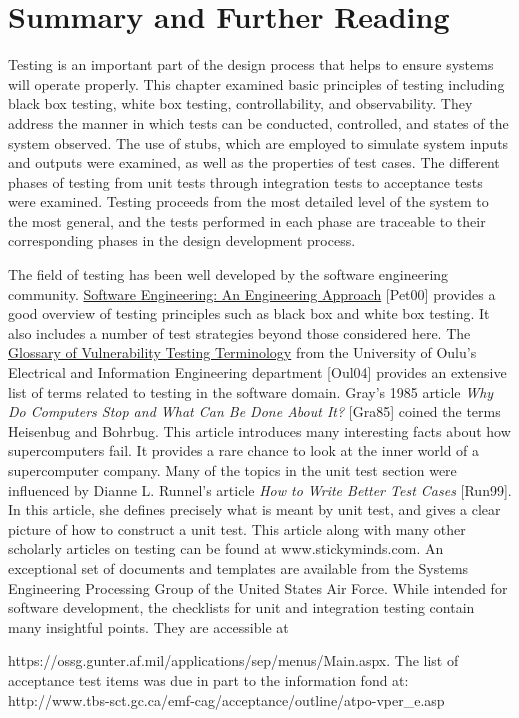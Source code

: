 \section{Summary and Further Reading}
\label{section:summary-and-further-reading}

Testing is an important part of the design process that helps to ensure
systems will operate properly. This chapter examined basic principles of
testing including black box testing, white box testing, controllability,
and observability. They address the manner in which tests can be
conducted, controlled, and states of the system observed. The use of
stubs, which are employed to simulate system inputs and outputs were
examined, as well as the properties of test cases. The different phases
of testing from unit tests through integration tests to acceptance tests
were examined. Testing proceeds from the most detailed level of the
system to the most general, and the tests performed in each phase are
traceable to their corresponding phases in the design development
process.

The field of testing has been well developed by the software engineering
community. \ul{Software Engineering: An Engineering Approach}
{[}Pet00{]} provides a good overview of testing principles such as black
box and white box testing. It also includes a number of test strategies
beyond those considered here. The \ul{Glossary of Vulnerability Testing
Terminology} from the University of Oulu's Electrical and Information
Engineering department {[}Oul04{]} provides an extensive list of terms
related to testing in the software domain. Gray's 1985 article \emph{Why
Do Computers Stop and What Can Be Done About It?} {[}Gra85{]} coined the
terms Heisenbug and Bohrbug. This article introduces many interesting
facts about how supercomputers fail. It provides a rare chance to look
at the inner world of a supercomputer company. Many of the topics in the
unit test section were influenced by Dianne L. Runnel's article
\emph{How to Write Better Test Cases} {[}Run99{]}. In this article, she
defines precisely what is meant by unit test, and gives a clear picture
of how to construct a unit test. This article along with many other
scholarly articles on testing can be found at www.stickyminds.com. An
exceptional set of documents and templates are available from the
Systems Engineering Processing Group of the United States Air Force.
While intended for software development, the checklists for unit and
integration testing contain many insightful points. They are accessible
at

https://ossg.gunter.af.mil/applications/sep/menus/Main.aspx. The list of
acceptance test items was due in part to the information fond at:
http://www.tbs-sct.gc.ca/emf-cag/acceptance/outline/atpo-vper\_e.asp

